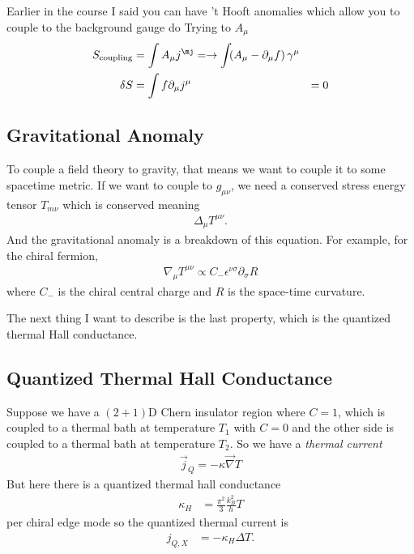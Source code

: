 Earlier in the course I said you can have 't Hooft anomalies
which allow you to couple to the background gauge do
Trying to $A_\mu$
\begin{align}
    S_{\mathrm{coupling}} &=
    \int A_\mu j^\mj
    = \to \int_{} \left( A_\mu - \partial_\mu f \right) \gamma^\mu\\
    \delta S &= \int f \partial_\mu j^\mu &= 0
\end{align}

\subsection{Gravitational Anomaly}
To couple a field theory to gravity,
that means we want to couple it to some spacetime metric.
If we want to couple to $g_{\mu\nu}$,
we need a conserved stress energy tensor $T_{m\nu}$
which is conserved meaning
\begin{align}
    \Delta_\mu T^{\mu\nu}.
\end{align}
And the gravitational anomaly is a breakdown of this equation.
For example,
for the chiral fermion,
\begin{align}
    \nabla_\mu T^{\mu\nu} \propto C_{-}\epsilon^{\nu\sigma}\partial_{\sigma}R
\end{align}
where $C_{-}$ is the chiral central charge
and $R$ is the space-time curvature.

The next thing I want to describe is the last property,
which is the quantized thermal Hall conductance.

\subsection{Quantized Thermal Hall Conductance}
Suppose we have a $(2+1)$D Chern insulator region
where $C=1$,
which is coupled to a thermal bath at temperature $T_1$ with $C=0$
and the other side is coupled to a thermal bath at temperature $T_2$.
So we have a \emph{thermal current}
\begin{align}
    \vec{j}_Q = -\kappa \vec{\nabla} T
\end{align}
But here there is a quantized thermal hall conductance
\begin{align}
    \kappa_H &=
    \frac{\pi^2}{3} \frac{k_B^2}{h}T
\end{align}
per chiral edge mode
so the quantized thermal current is
\begin{align}
    j_{Q,X} &= -\kappa_H \Delta T.
\end{align}


